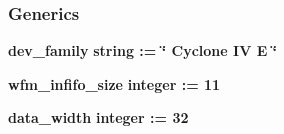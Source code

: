 \subsubsection*{Generics}
 \begin{DoxyCompactItemize}
\item 
{\bf dev\+\_\+family} {\bfseries {\bfseries \textcolor{comment}{string}\textcolor{vhdlchar}{ }\textcolor{vhdlchar}{ }\textcolor{vhdlchar}{\+:}\textcolor{vhdlchar}{=}\textcolor{vhdlchar}{ }\textcolor{vhdlchar}{ }\textcolor{vhdlchar}{ }\textcolor{vhdlchar}{ }\textcolor{keyword}{\char`\"{} Cyclone I\+V E \char`\"{}}\textcolor{vhdlchar}{ }}}
\item 
{\bf wfm\+\_\+infifo\+\_\+size} {\bfseries {\bfseries \textcolor{comment}{integer}\textcolor{vhdlchar}{ }\textcolor{vhdlchar}{ }\textcolor{vhdlchar}{\+:}\textcolor{vhdlchar}{=}\textcolor{vhdlchar}{ }\textcolor{vhdlchar}{ } \textcolor{vhdldigit}{11} \textcolor{vhdlchar}{ }}}
\item 
{\bf data\+\_\+width} {\bfseries {\bfseries \textcolor{comment}{integer}\textcolor{vhdlchar}{ }\textcolor{vhdlchar}{ }\textcolor{vhdlchar}{\+:}\textcolor{vhdlchar}{=}\textcolor{vhdlchar}{ }\textcolor{vhdlchar}{ } \textcolor{vhdldigit}{32} \textcolor{vhdlchar}{ }}}
\end{DoxyCompactItemize}
